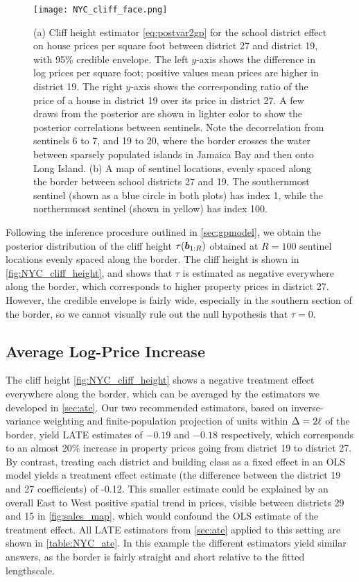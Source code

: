 \begin{figure}[tb]
    \centering
    \texttt{[image: NYC\_cliff\_face.png]}
    \caption{\label{fig:NYC_cliff_height}
        (a)
        Cliff height estimator \autoref{eq:postvar2gp} for the school district effect on house prices per square foot between district 27 and district 19, with 95\% credible envelope.
        The left \(y\)-axis shows the difference in log prices per square foot; positive values mean prices are higher in district 19.
        The right \(y\)-axis shows the corresponding ratio of the price of a house in district 19 over its price in district 27.
        A few draws from the posterior are shown in lighter color to show the posterior correlations between sentinels.
        Note the decorrelation from sentinels 6 to 7, and 19 to 20, where the border crosses the water between sparsely populated islands in Jamaica Bay and then onto Long Island.
        (b)
        A map of sentinel locations, evenly spaced along the border between school districts 27 and 19.
        The southernmost sentinel (shown as a blue circle in both plots) has index 1, while the northernmost sentinel (shown in yellow) has index 100.
    }
\end{figure}

Following the inference procedure outlined in \autoref{sec:gpmodel}, we obtain the posterior distribution of the cliff height \(\tau(\bm{b}_{1:R})\) obtained at \(R=100\) sentinel locations evenly spaced along the border.
The cliff height is shown in \autoref{fig:NYC_cliff_height}, and shows that \(\tau\) is estimated as negative everywhere along the border, which corresponds to higher property prices in district 27.
However, the credible envelope is fairly wide, especially in the southern section of the border, so we cannot visually rule out the null hypothesis that \(\tau=0\).

\subsection{Average Log-Price Increase}
The cliff height \autoref{fig:NYC_cliff_height} shows a negative treatment effect everywhere along the border, which can be averaged by the estimators we developed in \autoref{sec:ate}.
Our two recommended estimators, based on inverse-variance weighting and finite-population projection of units within \(\Delta=2\ell\) of the border, yield LATE estimates of \(-0.19\) and \(-0.18\) respectively, which corresponds to an almost 20\% increase in property prices going from district 19 to district 27.
By contrast, treating each district and building class as a fixed effect in an OLS model yields a treatment effect estimate (the difference between the district 19 and 27 coefficients) of -0.12. 
This smaller estimate could be explained by an overall East to West positive spatial trend in prices, visible between districts 29 and 15 in \autoref{fig:sales_map}, which would confound the OLS estimate of the treatment effect.
All LATE estimators from \autoref{sec:ate} applied to this setting are shown in \autoref{table:NYC_ate}.
In this example the different estimators yield similar answers, as the border is fairly straight and short relative to the fitted lengthscale.


